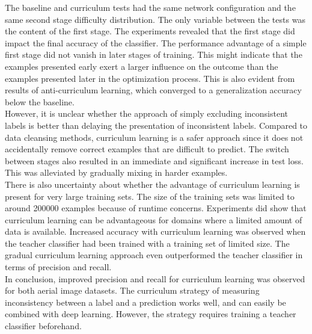The baseline and curriculum tests had the same network configuration and the same second stage difficulty distribution. The only variable between the tests was the content of the first stage. The experiments revealed that the first stage did impact the final accuracy of the classifier. The performance advantage of a simple first stage did not vanish in later stages of training. This might indicate that the examples presented early exert a larger influence on the outcome than the examples presented later in the optimization process. This is also evident from results of anti-curriculum learning, which converged to a generalization accuracy below the baseline. \\

However, it is unclear whether the approach of simply excluding inconsistent labels is better than delaying the presentation of inconsistent labels. Compared to data cleansing methods, curriculum learning is a safer approach since it does not accidentally remove correct examples that are difficult to predict. The switch between stages also resulted in an immediate and significant increase in test loss. This was alleviated by gradually mixing in harder examples.\\

There is also uncertainty about whether the advantage of curriculum learning is present for very large training sets. The size of the training sets was limited to around 200000 examples because of runtime concerns. Experiments did show that curriculum learning can be advantageous for domains where a limited amount of data is available. Increased accuracy with curriculum learning was observed when the teacher classifier had been trained with a training set of limited size. The gradual curriculum learning approach even outperformed the teacher classifier in terms of precision and recall.\\

In conclusion, improved precision and recall for curriculum learning was observed for both aerial image datasets. The curriculum strategy of measuring inconsistency between a label and a prediction works well, and can easily be combined with deep learning. However, the strategy requires training a teacher classifier beforehand.


